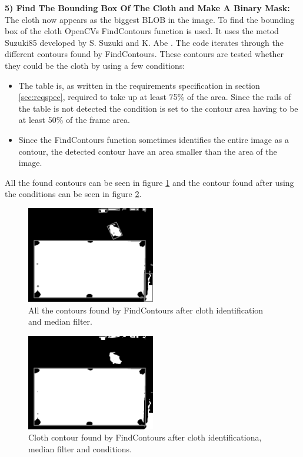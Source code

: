 \textbf{5) Find The Bounding Box Of The Cloth and Make A Binary Mask:}\\
The cloth now appears as the biggest BLOB in the image. To find the bounding box of the cloth OpenCVs FindContours function is used. It uses the metod Suzuki85 developed by S. Suzuki and K. Abe \cite{contour}. The code iterates through the different contours found by FindContours. These contours are tested whether they could be the cloth by using a few conditions:

\begin{itemize}
\setlength{\itemsep}{0mm}
	\item The table is, as written in the requirements specification in section \ref{sec:reqspec}, required to take up at least 75\% of the area. Since the rails of the table is not detected the condition is set to the contour area having to be at least 50\% of the frame area. 
	\item Since the FindContours function sometimes identifies the entire image as a contour, the detected contour have an area smaller than the area of the image.
\end{itemize}

All the found contours can be seen in figure \ref{fig:allcontours} and the contour found after using the conditions can be seen in figure \ref{fig:clothcontour}.
\begin{figure}[H]
\begin{center}
\leavevmode
\includegraphics[width=0.5\textwidth]{images/allcontours}
\end{center}
\caption{All the contours found by FindContours after cloth identification and median filter.}
\label{fig:allcontours}
\end{figure}

\begin{figure}[H]
\begin{center}
\leavevmode
\includegraphics[width=0.5\textwidth]{images/clothcontour}
\end{center}
\caption{Cloth contour found by FindContours after cloth identificationa, median filter and conditions.}
\label{fig:clothcontour}
\end{figure}

